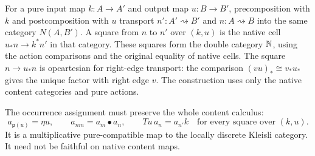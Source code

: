 \documentclass[11pt]{article}
\numberwithin{equation}{section}
\theoremstyle{definition}\newtheorem{definition}[theorem]{Definition}
\newcommand{\pure}{\mathsf p}\newcommand{\grade}{\mathsf G}
\begin{document}
For a pure input map \(k:A\to A'\) and output map \(u:B\to B'\),
precomposition with \(k\) and postcomposition with \(u\) transport
\(n':A'\rightsquigarrow B'\) and \(n:A\rightsquigarrow B\) into the
same category \(N(A,B')\). A square from \(n\) to \(n'\) over
\((k,u)\) is the native cell \(u_*n\to k^*n'\) in that category.
These squares form the double category \(\mathbb N\), using the action
comparisons and the original equality of native cells. The square
\(n\to u_*n\) is opcartesian for right-edge transport: the comparison
\((vu)_*\cong v_*u_*\) gives the unique factor with right edge \(v\). The
construction uses only the native content categories and pure actions.

The occurrence assignment must preserve the whole content calculus:
\begin{equation}\label{eq:arity}
 a_{\pure(u)}=\eta u,\qquad a_{nm}=a_m\bullet a_n,
 \qquad Tu\,a_n=a_{n'}k\quad\text{for every square over }(k,u).
\end{equation}
It is a multiplicative pure-compatible map to the locally discrete
Kleisli category. It need not be faithful on native content maps.
\end{document}
